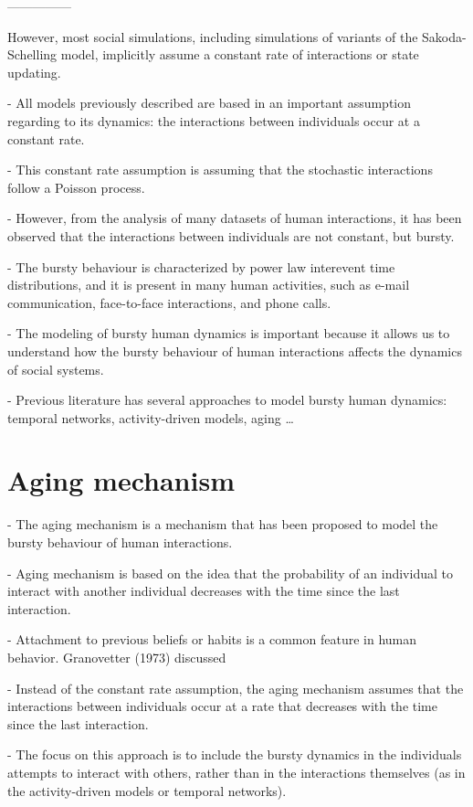 ---------------


However, most social simulations, including simulations of variants of the Sakoda-Schelling model, implicitly assume a constant rate of interactions or state updating. 

- All models previously described are based in an important assumption regarding to its dynamics: the interactions between individuals occur at a constant rate.

- This constant rate assumption is assuming that the stochastic interactions follow a Poisson process. 

- However, from the analysis of many datasets of human interactions, it has been observed that the interactions between individuals are not constant, but bursty.

- The bursty behaviour is characterized by power law interevent time distributions, and it is present in many human activities, such as e-mail communication, face-to-face interactions, and phone calls.

- The modeling of bursty human dynamics is important because it allows us to understand how the bursty behaviour of human interactions affects the dynamics of social systems.

- Previous literature has several approaches to model bursty human dynamics: temporal networks, activity-driven models, aging \dots

\section{\label{sec:Aging mechanism} Aging mechanism}

- The aging mechanism is a mechanism that has been proposed to model the bursty behaviour of human interactions.

- Aging mechanism is based on the idea that the probability of an individual to interact with another individual decreases with the time since the last interaction.

- Attachment to previous beliefs or habits is a common feature in human behavior. Granovetter (1973) discussed 

- Instead of the constant rate assumption, the aging mechanism assumes that the interactions between individuals occur at a rate that decreases with the time since the last interaction.

- The focus on this approach is to include the bursty dynamics in the individuals attempts to interact with others, rather than in the interactions themselves (as in the activity-driven models or temporal networks).

